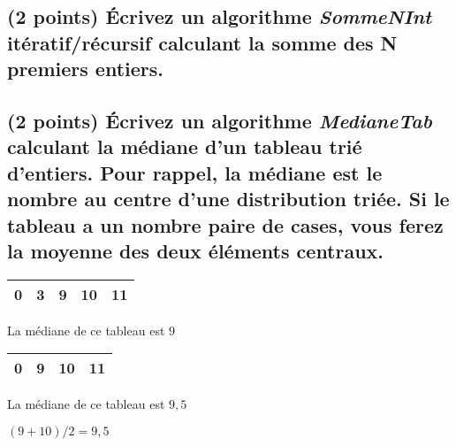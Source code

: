 \documentclass[11pt,a4paper]{article}
\begin{document}






\subsection{(2 points) \'Ecrivez un algorithme \og \textit{SommeNInt} \fg{} itératif/récursif calculant la somme des N premiers entiers. }

\bigskip

\begin{center}
\end{center}

\bigskip


\subsection{(2 points) \'Ecrivez un algorithme \og \textit{MedianeTab} \fg{} calculant la médiane d'un tableau trié d'entiers. Pour rappel, la médiane est le nombre au centre d'une distribution triée. Si le tableau a un nombre paire de cases, vous ferez la moyenne des deux éléments centraux. }

\medskip


\begin{table}[h!]
  \centering
  \begin{minipage}{0.4\textwidth}
    \centering
    \begin{tabular}{| c | c | c | c | c |}
      \hline
      0 & 3 & 9 & 10 & 11 \\
      \hline
    \end{tabular}

  \smallskip

  La médiane de ce tableau est $ 9 $
  \end{minipage}
    \hfillx
    \begin{minipage}{0.4\textwidth}
    \centering
    \begin{tabular}{| c | c | c | c |}
      \hline
      0 & 9 & 10 & 11 \\
      \hline
    \end{tabular}

  \smallskip

  La médiane de ce tableau est $ 9,5 $

  $ (9 + 10) / 2 = 9,5 $
  \end{minipage}
\end{table}
\end{document}
